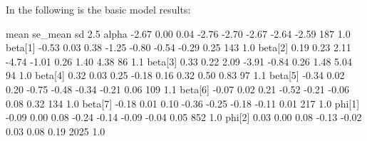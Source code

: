 \documentclass[]{tufte-handout}
\newenvironment{Shaded}{}{}
\newcommand{\DecValTok}[1]{\textcolor[rgb]{0.25,0.63,0.44}{#1}}
\newcommand{\FloatTok}[1]{\textcolor[rgb]{0.25,0.63,0.44}{#1}}
\newcommand{\NormalTok}[1]{#1}
\newcommand{\OperatorTok}[1]{\textcolor[rgb]{0.40,0.40,0.40}{#1}}
\newcommand{\StringTok}[1]{\textcolor[rgb]{0.25,0.44,0.63}{#1}}
\begin{document}
In the following is the basic model results:

\begin{Shaded}
\begin{Highlighting}[]
\NormalTok{           mean se_mean   sd    }\FloatTok{2.5}\OperatorTok{%
\NormalTok{alpha     }\FloatTok{-2.67}    \FloatTok{0.00} \FloatTok{0.04}   \FloatTok{-2.76}   \FloatTok{-2.70}   \FloatTok{-2.67}   \FloatTok{-2.64}   \FloatTok{-2.59}   \DecValTok{187}  \FloatTok{1.0}
\NormalTok{beta[}\DecValTok{1}\NormalTok{]   }\FloatTok{-0.53}    \FloatTok{0.03} \FloatTok{0.38}   \FloatTok{-1.25}   \FloatTok{-0.80}   \FloatTok{-0.54}   \FloatTok{-0.29}    \FloatTok{0.25}   \DecValTok{143}  \FloatTok{1.0}
\NormalTok{beta[}\DecValTok{2}\NormalTok{]    }\FloatTok{0.19}    \FloatTok{0.23} \FloatTok{2.11}   \FloatTok{-4.74}   \FloatTok{-1.01}    \FloatTok{0.26}    \FloatTok{1.40}    \FloatTok{4.38}    \DecValTok{86}  \FloatTok{1.1}
\NormalTok{beta[}\DecValTok{3}\NormalTok{]    }\FloatTok{0.33}    \FloatTok{0.22} \FloatTok{2.09}   \FloatTok{-3.91}   \FloatTok{-0.84}    \FloatTok{0.26}    \FloatTok{1.48}    \FloatTok{5.04}    \DecValTok{94}  \FloatTok{1.0}
\NormalTok{beta[}\DecValTok{4}\NormalTok{]    }\FloatTok{0.32}    \FloatTok{0.03} \FloatTok{0.25}   \FloatTok{-0.18}    \FloatTok{0.16}    \FloatTok{0.32}    \FloatTok{0.50}    \FloatTok{0.83}    \DecValTok{97}  \FloatTok{1.1}
\NormalTok{beta[}\DecValTok{5}\NormalTok{]   }\FloatTok{-0.34}    \FloatTok{0.02} \FloatTok{0.20}   \FloatTok{-0.75}   \FloatTok{-0.48}   \FloatTok{-0.34}   \FloatTok{-0.21}    \FloatTok{0.06}   \DecValTok{109}  \FloatTok{1.1}
\NormalTok{beta[}\DecValTok{6}\NormalTok{]   }\FloatTok{-0.07}    \FloatTok{0.02} \FloatTok{0.21}   \FloatTok{-0.52}   \FloatTok{-0.21}   \FloatTok{-0.06}    \FloatTok{0.08}    \FloatTok{0.32}   \DecValTok{134}  \FloatTok{1.0}
\NormalTok{beta[}\DecValTok{7}\NormalTok{]   }\FloatTok{-0.18}    \FloatTok{0.01} \FloatTok{0.10}   \FloatTok{-0.36}   \FloatTok{-0.25}   \FloatTok{-0.18}   \FloatTok{-0.11}    \FloatTok{0.01}   \DecValTok{217}  \FloatTok{1.0}
\NormalTok{phi[}\DecValTok{1}\NormalTok{]    }\FloatTok{-0.09}    \FloatTok{0.00} \FloatTok{0.08}   \FloatTok{-0.24}   \FloatTok{-0.14}   \FloatTok{-0.09}   \FloatTok{-0.04}    \FloatTok{0.05}   \DecValTok{852}  \FloatTok{1.0}
\NormalTok{phi[}\DecValTok{2}\NormalTok{]     }\FloatTok{0.03}    \FloatTok{0.00} \FloatTok{0.08}   \FloatTok{-0.13}   \FloatTok{-0.02}    \FloatTok{0.03}    \FloatTok{0.08}    \FloatTok{0.19}  \DecValTok{2025}  \FloatTok{1.0}
}
\end{Highlighting}
\end{Shaded}
\end{document}
